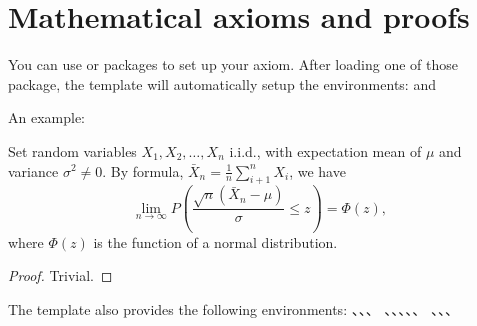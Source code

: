\section{Mathematical axioms and proofs}

You can use  or  packages to set up your axiom. After loading one of those package, the template will automatically setup the environments:  and 

An example:
\begin{theorem}
  Set random variables $X_1, X_2, \dots, X_n$ i.i.d., with expectation mean of $\mu$ and variance $\sigma^2 \ne 0$. By formula, $\bar{X}_n = \frac{1}{n} \sum_{i+1}^n X_i$, we have
  \begin{equation}
    \lim_{n \to \infty} P \left(\frac{\sqrt{n} \left( \bar{X}_n - \mu \right)}{\sigma} \le z \right) = \Phi(z),
  \end{equation}
  where $\Phi(z)$ is the function of a normal distribution.
\end{theorem}
\begin{proof}
  Trivial.
\end{proof}

The template also provides the following environments: 、、、
、、、、、
、、、 